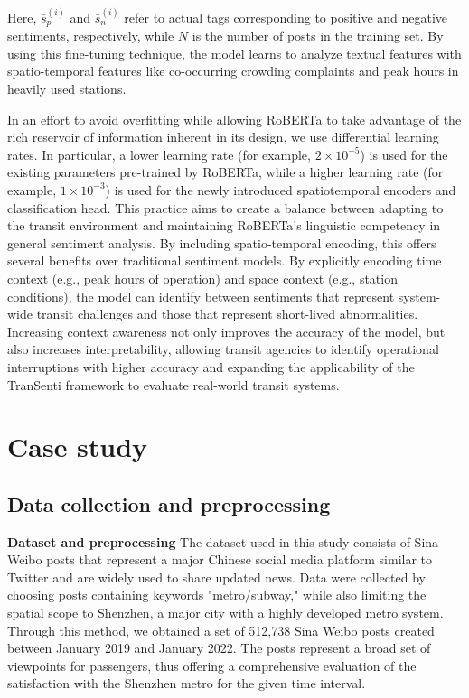 \documentclass[a4paper,fleqn,12pt]{cas-sc}
\begin{document}
Here, \( \bar{s}^{(i)}_{p} \) and \( \bar{s}^{(i)}_{n} \) refer to actual tags corresponding to positive and negative sentiments, respectively, while \( N \) is the number of posts in the training set. By using this fine-tuning technique, the model learns to analyze textual features with spatio-temporal features like co-occurring crowding complaints and peak hours in heavily used stations.

In an effort to avoid overfitting while allowing RoBERTa to take advantage of the rich reservoir of information inherent in its design, we use differential learning rates. In particular, a lower learning rate (for example, \(2 \times 10^{-5}\)) is used for the existing parameters pre-trained by RoBERTa, while a higher learning rate (for example, \(1 \times 10^{-3}\)) is used for the newly introduced spatiotemporal encoders and classification head. This practice aims to create a balance between adapting to the transit environment and maintaining RoBERTa's linguistic competency in general sentiment analysis. By including spatio-temporal encoding, this offers several benefits over traditional sentiment models. By explicitly encoding time context (e.g., peak hours of operation) and space context (e.g., station conditions), the model can identify between sentiments that represent system-wide transit challenges and those that represent short-lived abnormalities. Increasing context awareness not only improves the accuracy of the model, but also increases interpretability, allowing transit agencies to identify operational interruptions with higher accuracy and expanding the applicability of the TranSenti framework to evaluate real-world transit systems.

\section{Case study}\label{sec:experiments}

\subsection{Data collection and preprocessing}

\textbf{Dataset and preprocessing} \quad 
The dataset used in this study consists of Sina Weibo posts that represent a major Chinese social media platform similar to Twitter and are widely used to share updated news. Data were collected by choosing posts containing keywords "metro/subway," while also limiting the spatial scope to Shenzhen, a major city with a highly developed metro system. Through this method, we obtained a set of 512,738 Sina Weibo posts created between January 2019 and January 2022. The posts represent a broad set of viewpoints for passengers, thus offering a comprehensive evaluation of the satisfaction with the Shenzhen metro for the given time interval.
\end{document}
